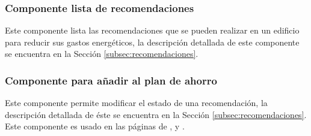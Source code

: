\subsubsection{Componente lista de recomendaciones}

Este componente lista las recomendaciones que se pueden realizar en un edificio para
reducir sus gastos energéticos, la descripción detallada de este componente se
encuentra en la Sección \ref{subsec:recomendaciones}.

\subsubsection{Componente para añadir al plan de ahorro}

Este componente permite modificar el estado de una recomendación,
la descripción detallada de éste se encuentra en la Sección
\ref{subsec:recomendaciones}. Este componente es usado en las páginas de
,  y
.
